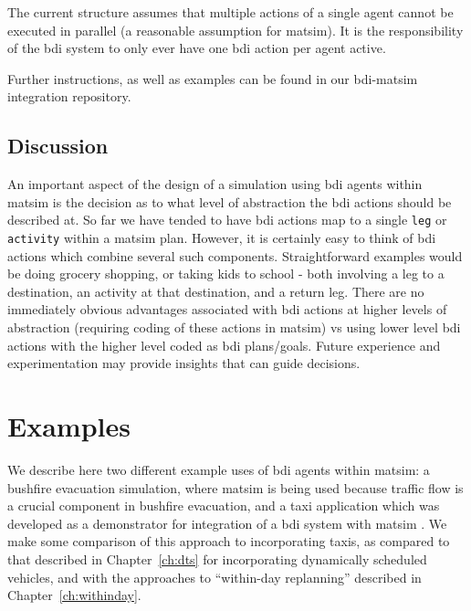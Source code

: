 The current structure assumes that multiple actions of a single agent
cannot be executed in parallel (a reasonable assumption for
\gls{matsim}). It is the responsibility of the \gls{bdi} system to only ever have
one \gls{bdi} action per agent active.

Further instructions, as well as examples can be found in our
\gls{bdi}-\gls{matsim} integration repository.

\subsection{Discussion}
An important aspect of the design of a simulation using \gls{bdi} agents
within \gls{matsim} is the decision as to what level of abstraction the \gls{bdi}
actions should be described at. So far we have tended to have \gls{bdi}
actions map to a single \lstinline{leg} or \lstinline{activity} within a
\gls{matsim} plan. However, it is certainly easy to think of \gls{bdi} actions
which combine several such components. Straightforward examples would
be doing grocery shopping, or taking kids to school - both involving a
leg to a destination, an activity at that destination, and a return
leg. There are no immediately obvious advantages associated with \gls{bdi}
actions at higher levels of abstraction (requiring coding of these
actions in \gls{matsim}) vs using lower level \gls{bdi} actions with the higher
level coded as \gls{bdi} plans/goals. Future experience and experimentation
may provide insights that can guide decisions.

\section{Examples}
\label{sec:bid-examples}
We describe here two different example uses of \gls{bdi} agents within
\gls{matsim}: a bushfire evacuation simulation, where \gls{matsim} is
being used because traffic flow is a crucial component in bushfire
evacuation, and a taxi application which was developed as a
demonstrator for integration of a \gls{bdi} system with \gls{matsim} \citep{ecai}. We make
some comparison of this approach to incorporating taxis, as compared to
that described in Chapter~\ref{ch:dts} for
incorporating dynamically scheduled vehicles, and with the approaches
to ``within-day replanning'' described in Chapter~\ref{ch:withinday}.

